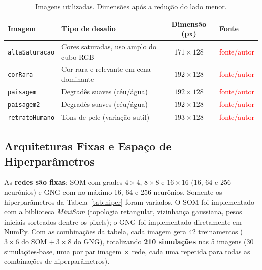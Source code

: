 \documentclass[11pt,a4paper]{article}
\newcommand{\todo}[1]{\textcolor{red}{#1}}
\begin{document}
\begin{table}[h]
\centering
\small
\caption{Imagens utilizadas. Dimensões após a redução do lado menor.}
\label{tab:imagens}
\begin{tabularx}{\textwidth}{llcX}
\toprule
\textbf{Imagem} & \textbf{Tipo de desafio} & \textbf{Dimensão (px)} & \textbf{Fonte} \\
\midrule
\texttt{altaSaturacao}  & Cores saturadas, uso amplo do cubo RGB & $171\times128$ & \todo{fonte/autor} \\
\texttt{corRara}        & Cor rara e relevante em cena dominante & $192\times128$ & \todo{fonte/autor} \\
\texttt{paisagem}       & Degradês suaves (céu/água) & $192\times128$ & \todo{fonte/autor} \\
\texttt{paisagem2}      & Degradês suaves (céu/água) & $192\times128$ & \todo{fonte/autor} \\
\texttt{retratoHumano}  & Tons de pele (variação sutil) & $193\times128$ & \todo{fonte/autor} \\
\bottomrule
\end{tabularx}
\end{table}

\subsection{Arquiteturas Fixas e Espaço de Hiperparâmetros}
As \textbf{redes são fixas}: SOM com grades $4\times4$, $8\times8$ e $16\times16$ (16, 64 e 256 neurônios) e GNG com no máximo 16, 64 e 256 neurônios. Somente os hiperparâmetros da Tabela~\ref{tab:hiper} foram variados. O SOM foi implementado com a biblioteca \textit{MiniSom} (topologia retangular, vizinhança gaussiana, pesos iniciais sorteados dentre os pixels); o GNG foi implementado diretamente em NumPy. Com as combinações da tabela, cada imagem gera 42 treinamentos ($3\times6$ do SOM $+\ 3\times8$ do GNG), totalizando \textbf{210 simulações} nas 5 imagens (30 simulações-base, uma por par imagem $\times$ rede, cada uma repetida para todas as combinações de hiperparâmetros).
\end{document}
